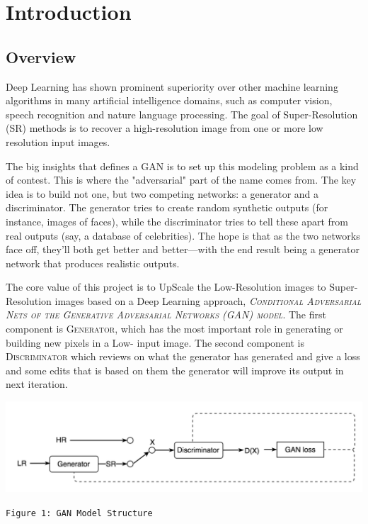 \documentclass[12pt]{article}
\begin{document}
	\setcounter{page}{1}
	\renewcommand{\contentsname}{Table Of Contents}
	\tableofcontents
	
	\clearpage
	\section{Introduction}
		\subsection{Overview}
			Deep Learning has shown prominent superiority over other machine learning algorithms in many artificial intelligence domains, such as computer vision, speech recognition and nature language processing. The goal of Super-Resolution (SR) methods is to recover a high-resolution image from one or more low resolution input images.
		
			The big insights that defines a GAN is to set up this modeling problem as a kind of contest. This is where the "adversarial" part of the name comes from. The key idea is to build not one, but two competing networks: a generator and a discriminator. The generator tries to create random synthetic outputs (for instance, images of faces), while the discriminator tries to tell these apart from real outputs (say, a database of celebrities). The hope is that as the two networks face off, they'll both get better and better—with the end result being a generator network that produces realistic outputs.

			The core value of this project is to UpScale the Low-Resolution images to Super-Resolution images based on a Deep Learning approach, \textit{\textsc{Conditional Adversarial Nets of the Generative Adversarial Networks (GAN) model}}. The first component is \textsc{Generator}, which has the most important role in generating or building new pixels in a Low- input image. The second component is \textsc{Discriminator} which reviews on what the generator has generated and give a loss and some edits that is based on them the generator will improve its output in next iteration.
			\begin{center}
				\vspace{0.1in}
				\includegraphics[width=6in]{Images/GANStructure.png}
				
				\texttt{Figure 1: GAN Model Structure}
				\vspace{0.1in}
			\end{center}
			
\end{document}
